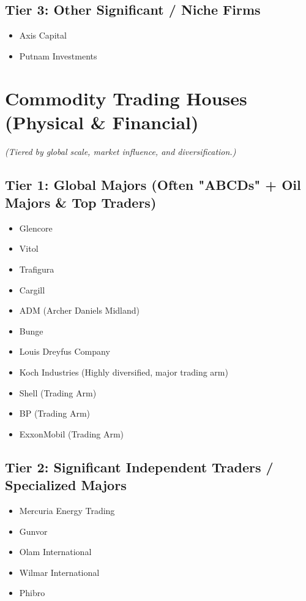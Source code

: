 \documentclass[11pt,a4paper]{article}
\begin{document}
\subsection*{Tier 3: Other Significant / Niche Firms}
\begin{multicols}{3}
\begin{itemize}[label=\textbullet, leftmargin=*, itemsep=1pt, parsep=0pt]
    \item Axis Capital
    \item Putnam Investments
\end{itemize}
\end{multicols}

\section*{Commodity Trading Houses (Physical \& Financial)}
\begin{center}
\footnotesize
\textit{(Tiered by global scale, market influence, and diversification.)}
\end{center}

\subsection*{Tier 1: Global Majors (Often "ABCDs" + Oil Majors \& Top Traders)}
\begin{multicols}{3}
\begin{itemize}[label=\textbullet, leftmargin=*, itemsep=1pt, parsep=0pt]
    \item Glencore
    \item Vitol
    \item Trafigura
    \item Cargill
    \item ADM (Archer Daniels Midland)
    \item Bunge
    \item Louis Dreyfus Company
    \item Koch Industries (Highly diversified, major trading arm)
    \item Shell (Trading Arm)
    \item BP (Trading Arm)
    \item ExxonMobil (Trading Arm)
\end{itemize}
\end{multicols}

\subsection*{Tier 2: Significant Independent Traders / Specialized Majors}
\begin{multicols}{3}
\begin{itemize}[label=\textbullet, leftmargin=*, itemsep=1pt, parsep=0pt]
    \item Mercuria Energy Trading
    \item Gunvor
    \item Olam International
    \item Wilmar International
    \item Phibro
\end{itemize}
\end{multicols}
\end{document}
